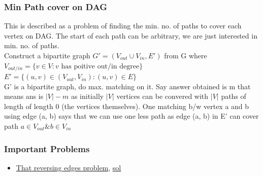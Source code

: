 \documentclass[8pt, a4paper, oneside, twocolumn]{extarticle}
\begin{document}
\subsubsection{Min Path cover on DAG}
This is described as a problem of finding the min. no. of paths to cover each vertex on DAG. The start of each path can be arbitrary, we are just interested in min. no. of paths.
\\Construct a bipartite graph $G' = (V_{out} \cup V_{in}, E')$ from G where $V_{out/in} = \{v \in V: v \text{ has poitive out/in degree}\}$
\\$E' = \{(u, v) \in (V_{out}, V_{in}) : (u, v) \in E\}$
\\G' is a bipartite graph, do max. matching on it. Say answer obtained is m that means ans is $|V| - m$ as initially $\vert V \vert$ vertices can be convered with $\vert V \vert$ paths of length of length 0 (the vertices themselves). One matching b/w vertex a and b using edge (a, b) says that we can use one less path as edge (a, b) in E' can cover path $a \in V_{out} \& b\in V_{in}$
\subsubsection{Important Problems}
\begin{itemize}
    \item \href{https://codeforces.com/contest/1100/problem/E}{That reversing edges problem}, \href{https://codeforces.com/contest/1100/submission/48343664}{sol}
\end{itemize}
\end{document}
